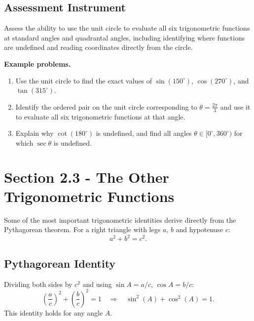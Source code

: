\subsection{Assessment Instrument}
\label{ssec:asse-3669}

Assess the ability to use the unit circle to evaluate all six trigonometric functions at
standard angles and quadrantal angles, including identifying where functions are undefined
and reading coordinates directly from the circle.

\textbf{Example problems.}
\begin{enumerate}
    \item Use the unit circle to find the exact values of $\sin(150^{\circ})$, $\cos(270^{\circ})$, and $\tan(315^{\circ})$.
    \item Identify the ordered pair on the unit circle corresponding to $\theta = \frac{2\pi}{3}$ and use it to evaluate all six trigonometric functions at that angle.
    \item Explain why $\cot(180^{\circ})$ is undefined, and find all angles $\theta \in [0^{\circ}, 360^{\circ})$ for which $\sec\theta$ is undefined.
\end{enumerate}

\section{Section 2.3 - The Other Trigonometric Functions}
\label{sec:sect-d920}

Some of the most important trigonometric identities derive directly from the
Pythagorean theorem.  For a right triangle with legs $a$, $b$ and hypotenuse
$c$:
\[
  a^{2} + b^{2} = c^{2}.
\]

\subsection*{Pythagorean Identity}

Dividing both sides by $c^{2}$ and using $\sin A = a/c$, $\cos A = b/c$:
\[
  \left(\frac{a}{c}\right)^{2} + \left(\frac{b}{c}\right)^{2} = 1
  \quad \Longrightarrow \quad
  \sin^{2}(A) + \cos^{2}(A) = 1.
\]
This identity holds for any angle $A$.

